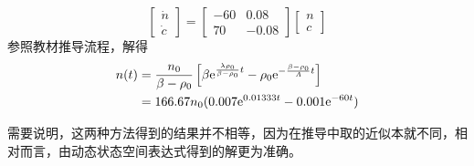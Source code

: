 \begin{exercise}
\begin{enumerate}
        \begin{equation*}
            \begin{bmatrix}
                \dot{n} \\
                \dot{c}
            \end{bmatrix} = \begin{bmatrix}
                -60 & 0.08 \\
                70 & -0.08
            \end{bmatrix} \begin{bmatrix}
                n \\
                c
            \end{bmatrix}
        \end{equation*}
        参照教材推导流程，解得
        \begin{align*}
            n(t) &= \frac{n_0}{\beta - \rho_0} \left[\beta {\rm e}^{\frac{\lambda \rho_0}{\beta - \rho_0}t} - \rho_0 {\rm e}^{-\frac{\beta - \rho_0}{\varLambda}t}\right] \\
            &= 166.67 n_0 (0.007{\rm e}^{0.01333t}-0.001{\rm e}^{-60t})
        \end{align*}
    \end{enumerate}
    需要说明，这两种方法得到的结果并不相等，因为在推导中取的近似本就不同，相对而言，由动态状态空间表达式得到的解更为准确。
\end{exercise}
